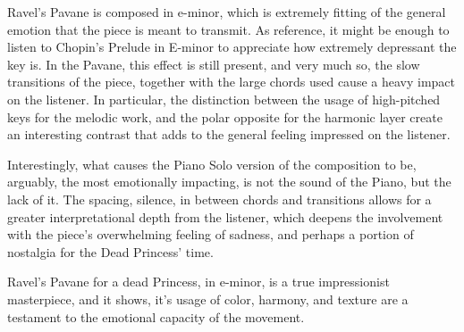 \documentclass[titlepage,12pt]{article}
\begin{document}
    Ravel's Pavane is composed in e-minor, which is extremely fitting of the general emotion that the piece is meant to transmit. As reference, it might be enough to listen to Chopin's Prelude in E-minor to appreciate how extremely depressant the key is. In the Pavane, this effect is still present, and very much so, the slow transitions of the piece, together with the large chords used cause a heavy impact on the listener. In particular, the distinction between the usage of high-pitched keys for the melodic work, and the polar opposite for the harmonic layer create an interesting contrast that adds to the general feeling impressed on the listener.

    Interestingly, what causes the Piano Solo version of the composition to be, arguably, the most emotionally impacting, is not the sound of the Piano, but the lack of it. The spacing, silence, in between chords and transitions allows for a greater interpretational depth from the listener, which deepens the involvement with the piece's overwhelming feeling of sadness, and perhaps a portion of nostalgia for the Dead Princess' time.

    Ravel's Pavane for a dead Princess, in e-minor, is a true impressionist masterpiece, and it shows, it's usage of color, harmony, and texture are a testament to the emotional capacity of the movement.
    
\end{document}

